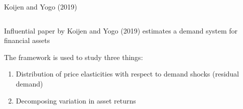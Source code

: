 \documentclass[notes,11pt, aspectratio=169]{beamer}
\newenvironment{wideitemize}{\itemize\addtolength{\itemsep}{10pt}}{\enditemize}
\begin{document}
\begin{frame}{Koijen and Yogo (2019)}
  \begin{columns}[T] %
    \begin{column}{.5\textwidth}
      \begin{wideitemize}
      \item Influential paper by Koijen and Yogo (2019) estimates a
        demand system for financial assets
      \item The framework is used to study three things:
        \begin{enumerate}
        \item Distribution of price elasticities with respect to demand shocks (residual demand)
        \item Decomposing variation in asset returns
        \end{enumerate}
      \end{wideitemize}
    \end{column}%
  \hfill%
  \begin{column}{.5\textwidth}

\end{column}
\end{columns}
\end{frame}
\end{document}
